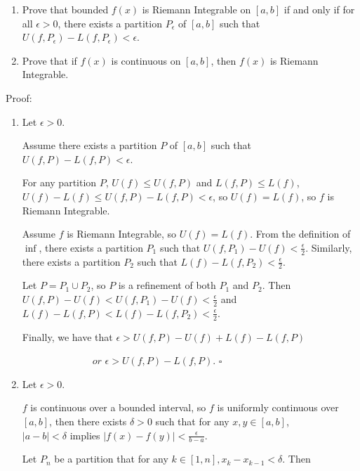 \documentclass{article}
\begin{document}
\begin{enumerate}
\item Prove that bounded $f(x)$ is Riemann Integrable on $[a,b]$ if and only if for all $\epsilon>0$, there exists a partition $P_\epsilon$ of $[a,b]$ such that \\$U(f,P_\epsilon)-L(f,P_\epsilon)<\epsilon$.
\item Prove that if $f(x)$ is continuous on $[a,b]$, then $f(x)$ is Riemann Integrable.

\end{enumerate}

Proof:

\begin{enumerate}
    \item Let $\epsilon > 0$.
    
    Assume there exists a partition $P$ of $[a,b]$ such that $U(f, P) - L(f, P) < \epsilon$.

    For any partition $P$, $U(f) \le U(f,P)$ and $L(f,P) \le L(f)$, \\ $U(f) - L(f) \le U(f,P) - L(f,P) < \epsilon$, so $U(f) = L(f)$, so $f$ is Riemann Integrable.

    Assume $f$ is Riemann Integrable, so $U(f) = L(f)$. From the definition of $\inf$, there exists a partition $P_1$ such that $U(f, P_1) - U(f) < \frac{\epsilon}{2}$. Similarly, there exists a partition $P_2$ such that $L(f) - L(f, P_2) < \frac{\epsilon}{2}$. 

    Let $P = P_1 \cup P_2$, so $P$ is a refinement of both $P_1$ and $P_2$. Then \\$U(f, P) - U(f) < U(f, P_1) - U(f) < \frac{\epsilon}{2}$ and \\$L(f) - L(f, P) < L(f) - L(f, P_2) < \frac{\epsilon}{2}$. 
    
    Finally, we have that $\epsilon > U(f, P) - U(f) + L(f) - L(f, P)$
    
    $\hspace{3cm}\textit{or } \epsilon > U(f,P) - L(f,P)$. $\square$

    \item Let $\epsilon > 0$.

    $f$ is continuous over a bounded interval, so $f$ is uniformly continuous over $[a,b]$, then there exists $\delta > 0$ such that for any $x, y \in [a,b]$, \\$|a-b| < \delta$ implies $|f(x) -f(y)| < \frac{\epsilon}{b-a}$.

    Let $P_n$ be a partition that for any $k \in [1,n], x_{k} - x_{k-1} < \delta$. Then 


\end{enumerate}
\end{document}
